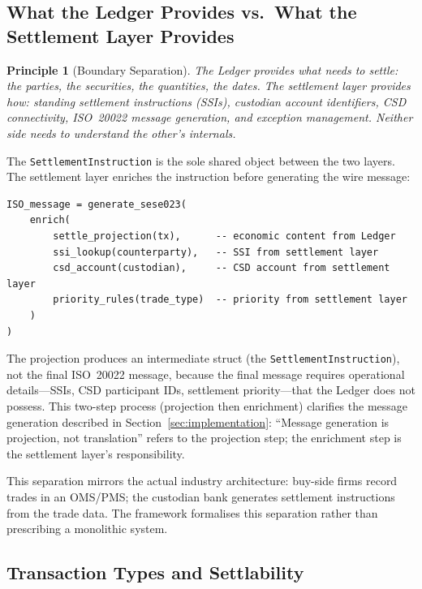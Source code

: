 \documentclass[11pt,a4paper]{article}
\newtheorem{principle}[definition]{Principle}
\begin{document}
\subsection{What the Ledger Provides vs.\ What the Settlement Layer Provides}
\label{sec:settlement-boundary}

\begin{principle}[Boundary Separation]
The Ledger provides \emph{what} needs to settle: the parties, the securities, the quantities, the dates. The settlement layer provides \emph{how}: standing settlement instructions (SSIs), custodian account identifiers, CSD connectivity, ISO~20022 message generation, and exception management. Neither side needs to understand the other's internals.
\end{principle}

\noindent The \texttt{SettlementInstruction} is the sole shared object between the two layers. The settlement layer enriches the instruction before generating the wire message:

\begin{lstlisting}
ISO_message = generate_sese023(
    enrich(
        settle_projection(tx),      -- economic content from Ledger
        ssi_lookup(counterparty),   -- SSI from settlement layer
        csd_account(custodian),     -- CSD account from settlement layer
        priority_rules(trade_type)  -- priority from settlement layer
    )
)
\end{lstlisting}

\noindent The projection produces an intermediate struct (the \texttt{SettlementInstruction}), not the final ISO~20022 message, because the final message requires operational details---SSIs, CSD participant IDs, settlement priority---that the Ledger does not possess. This two-step process (projection then enrichment) clarifies the message generation described in Section~\ref{sec:implementation}: ``Message generation is projection, not translation'' refers to the projection step; the enrichment step is the settlement layer's responsibility.

This separation mirrors the actual industry architecture: buy-side firms record trades in an OMS/PMS; the custodian bank generates settlement instructions from the trade data. The framework formalises this separation rather than prescribing a monolithic system.

\subsection{Transaction Types and Settlability}
\label{sec:settlement-types}
\end{document}
